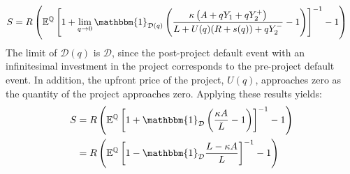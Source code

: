\documentclass[../main.tex]{subfiles}
\begin{document}
            \begin{align}
                    S
                &=
                    \grossrfrate
                    \left(
                        \mathbb{E}^{\rnmeasure}\left[
                            1
                            +
                            \lim_{q\rightarrow 0}
                            \mathbbm{1}_{\mathcal{D}(q)}
                            \left(
                                \frac{
                                    \kappa 
                                    \left(
                                        A + q Y_{1} + q Y_{2}^{+}
                                    \right)
                                }{
                                    L 
                                    +
                                    U(q)
                                    (\grossrfrate + s(q))
                                    +
                                    q Y_{2}^{-} 
                                }
                                -
                                1
                            \right) 
                        \right]^{-1}
                        - 
                        1
                    \right)
                \nonumber
            \end{align}
        The limit of $\mathcal{D}(q)$ is $\mathcal{D}$,
        since the post-project default event with an infinitesimal investment in the project
        corresponds to the pre-project default event.
        In addition, the upfront price of the project, $U(q)$,
        approaches zero as the quantity of the project approaches zero.
        Applying these results yields:
            \begin{align}
                    S
                &=
                    \grossrfrate
                    \left(
                        \mathbb{E}^{\rnmeasure}\left[
                            1
                            +
                            \mathbbm{1}_{\mathcal{D}}
                            \left(
                                \frac{
                                    \kappa 
                                    A
                                }{
                                    L 
                                }
                                -
                                1
                            \right) 
                        \right]^{-1}
                        - 
                        1
                    \right)
                \nonumber \\
                &=
                    \grossrfrate
                    \left(
                        \mathbb{E}^{\rnmeasure}\left[
                            1
                            -
                            \mathbbm{1}_{\mathcal{D}}
                                \frac{
                                    L
                                    -
                                    \kappa 
                                    A
                                }{
                                    L 
                                }
                        \right]^{-1}
                        - 
                        1
                    \right)
                \label{eqn:limiting-credit-spread-step-1}
            \end{align}
\end{document}
